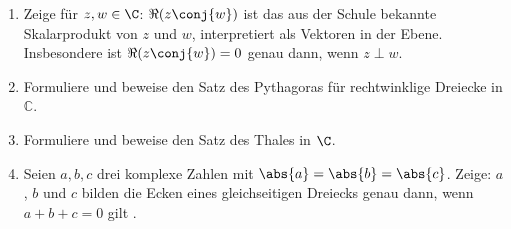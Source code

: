 \begin{prob}
  \begin{enumerate}[label=(\alph*)]
  \item Zeige für $z, w \in \C$: $\Re(z\conj{w})$ ist das aus der Schule
    bekannte Skalarprodukt von $z$ und $w$, interpretiert als Vektoren in der
    Ebene. Insbesondere ist $\Re(z\conj{w}) = 0$ genau dann, wenn $z \perp w$.
  \item Formuliere und beweise den Satz des Pythagoras für rechtwinklige
    Dreiecke in $\mathbb{C}$.
  \item Formuliere und beweise den Satz des Thales in $\C$.
  \item Seien $a, b, c$ drei komplexe Zahlen mit $\abs{a} = \abs{b} = \abs{c}$.
    Zeige: $a$, $b$ und $c$ bilden die Ecken eines gleichseitigen Dreiecks genau
    dann, wenn $a+b+c = 0$ gilt .
  \end{enumerate}
\end{prob}
